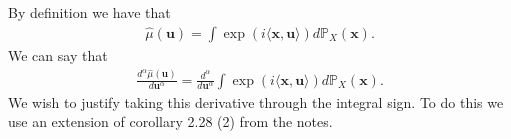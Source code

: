 \documentclass{unswmaths}
\begin{document}
\subsection{}
By definition we have that
\begin{align}
	\hat{\mu}(\mathbf{u}) = \int \exp(i \langle \mathbf{x}, \mathbf{u} \rangle ) d\mathbb{P}_{X}(\mathbf{x}).
\end{align}
We can say that
\begin{align}
	\frac{d^\alpha \hat{\mu}(\mathbf{u})}{d \mathbf{u}^\alpha} = \frac{d^\alpha}{d \mathbf{u}^\alpha} \int \exp(i \langle \mathbf{x}, \mathbf{u} \rangle ) d\mathbb{P}_{X}(\mathbf{x}).
\end{align}
We wish to justify taking this derivative through the integral sign. To do this we use an extension of corollary 2.28 (2) from the notes.
\clearpage
\end{document}

